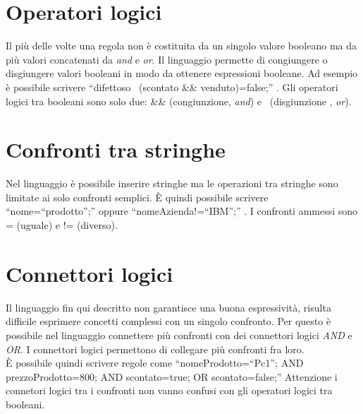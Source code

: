 \section{Operatori logici}
Il pi\`u delle volte una regola non \`e costituita da un singolo valore booleano ma da pi\`u valori concatenati da \textit{and} e \textit{or}. Il linguaggio permette di congiungere o disgiungere valori booleani in modo da ottenere espressioni booleane. Ad esempio \`e possibile scrivere ``difettoso \textbar \textbar\ (scontato \&\& venduto)=false;'' . Gli operatori logici tra booleani sono solo due: \&\& (congiunzione, \textit{and}) e \textbar \textbar\ (disgiunzione , \textit{or}).

\section{Confronti tra stringhe}
Nel linguaggio \`e possibile inserire stringhe ma le operazioni tra stringhe sono limitate ai solo confronti semplici. \`E quindi possibile scrivere ``nome=``prodotto'';'' oppure ``nomeAzienda!=``IBM'';'' . I confronti ammessi sono = (uguale) e != (diverso).

\section{Connettori logici}
Il linguaggio fin qui descritto non garantisce una buona espressivit\`a, risulta difficile esprimere concetti complessi con un singolo confronto. Per questo \`e possibile nel linguaggio connettere pi\`u confronti con dei connettori logici \textit{AND} e \textit{OR}. I connettori logici permettono di collegare pi\`u confronti fra loro.\\
\`E possibile quindi scrivere regole come ``nomeProdotto=``Pc1''; AND prezzoProdotto=800; AND scontato=true; OR scontato=false;''
 Attenzione i connetori logici tra i confronti non vanno confusi con gli operatori logici tra booleani.

